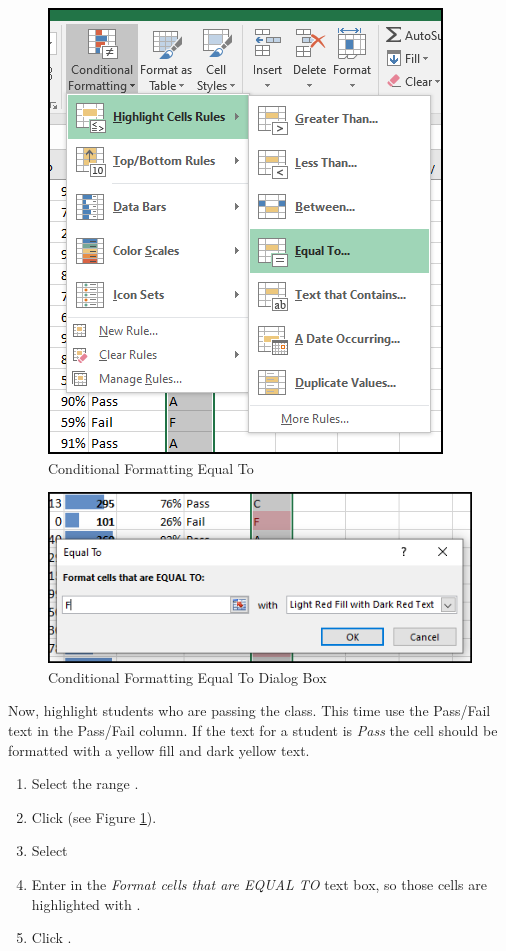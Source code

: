 \begin{figure}[H]
	\centering
	\includegraphics[width=\maxwidth{.95\linewidth}]{gfx/ch03_fig20}
	\caption{Conditional Formatting Equal To}
	\label{03:fig20}
\end{figure}

\begin{figure}[H]
	\centering
	\includegraphics[width=\maxwidth{.95\linewidth}]{gfx/ch03_fig21}
	\caption{Conditional Formatting Equal To Dialog Box}
	\label{03:fig21}
\end{figure}

Now, highlight students who are passing the class. This time use the Pass/Fail text in the Pass/Fail column. If the text for a student is \textit{Pass} the cell should be formatted with a yellow fill and dark yellow text.

\begin{enumerate}
	\item Select the range .
	\item Click  (see Figure \ref{03:fig20}).
	\item Select 
	\item Enter  in the \textit{Format cells that are EQUAL TO} text box, so those cells are highlighted with .
	\item Click .
\end{enumerate}

